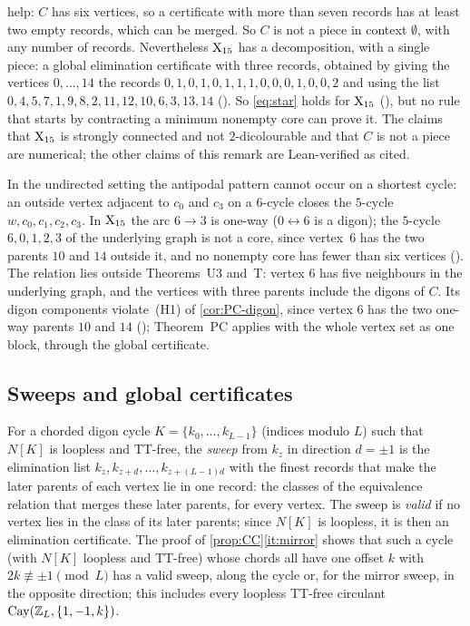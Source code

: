 \begin{remark}
help: $C$ has six vertices, so a certificate with more than seven records has at least two empty records, which can be
merged. So $C$ is not a piece in context $\emptyset$, with any number of records. Nevertheless $\mathrm{X}_{15}$ has a
decomposition, with a single piece: a global elimination certificate with three records, obtained by giving the vertices
$0,\dots,14$ the records $0,1,0,1,0,1,1,1,0,0,0,1,0,0,2$ and using the list $0,4,5,7,1,9,8,2,11,12,10,6,3,13,14$
(). So \eqref{eq:star} holds for $\mathrm{X}_{15}$ (), but no rule that starts by contracting a
minimum nonempty core can prove it. The claims that $\mathrm{X}_{15}$ is strongly connected and not $2$-dicolourable and that $C$ is
not a piece are numerical; the other claims of this remark are Lean-verified as cited.
\end{remark}

In the undirected setting the antipodal pattern cannot occur on a shortest cycle: an outside vertex adjacent to $c_0$ and
$c_3$ on a $6$-cycle closes the $5$-cycle $w,c_0,c_1,c_2,c_3$. In $\mathrm{X}_{15}$ the arc $6\to3$ is one-way
($0\leftrightarrow6$ is a digon); the $5$-cycle $6,0,1,2,3$ of the underlying graph is not a core, since vertex~$6$ has
the two parents $10$ and $14$ outside it, and no nonempty core has fewer than six vertices ().
The relation lies outside Theorems~U3 and~T: vertex $6$ has five neighbours in the underlying graph, and the vertices with
three parents include the digons of $C$. Its digon components violate~(H1) of \cref{cor:PC-digon}, since vertex $6$ has
the two one-way parents $10$ and $14$ (); Theorem~PC applies with the whole vertex set as one
block, through the global certificate.

\subsection{Sweeps and global certificates}\label{sec:sweeps}

For a chorded digon cycle $K=\{k_0,\dots,k_{L-1}\}$ (indices modulo $L$) such that $N[K]$ is loopless and TT-free, the
\emph{sweep} from $k_z$ in direction $d=\pm1$ is the elimination list $k_z,k_{z+d},\dots,k_{z+(L-1)d}$ with the finest
records that make the later parents of each vertex lie in one record: the classes of the equivalence relation that
merges these later parents, for every vertex. The sweep is \emph{valid} if no vertex lies in the class of its later
parents; since $N[K]$ is loopless, it is then an elimination certificate. The proof of \cref{prop:CC}\ref{it:mirror}
shows that such a cycle (with $N[K]$ loopless and TT-free) whose chords all have one offset $k$ with
$2k\not\equiv\pm1\pmod L$ has a valid sweep, along the cycle or, for the mirror sweep, in the opposite direction; this includes every loopless TT-free
circulant $\operatorname{Cay}(\mathbb{Z}_L,\{1,-1,k\})$.

